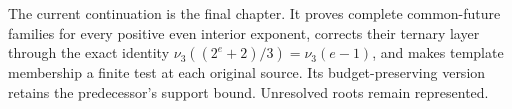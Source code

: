 \documentclass[11pt,oneside]{book}
\begin{document}
The current continuation is the final chapter. It proves complete common-future
families for every positive even interior exponent, corrects their ternary layer
through the exact identity $\nu_3((2^e+2)/3)=\nu_3(e-1)$, and makes template
membership a finite test at each original source. Its budget-preserving version
retains the predecessor's support bound. Unresolved roots remain represented.

\tableofcontents
\mainmatter
\end{document}
